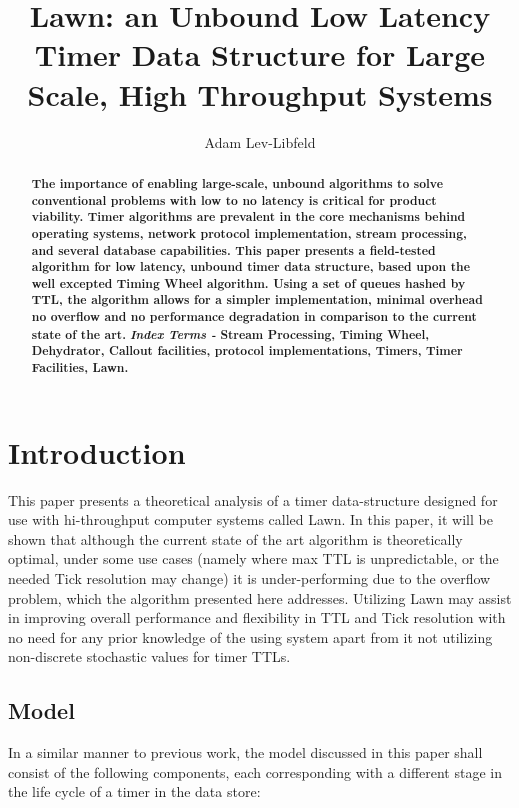 \documentclass[acmsmall]{acmart} %
\title{Lawn: an Unbound Low Latency Timer Data Structure for Large Scale, High Throughput Systems}
\author{Adam Lev-Libfeld}
\affiliation{
	\institution{Tamar Labs}
	\city{Tel-Aviv}
	\state{Israel}
}
\begin{document}
\maketitle

\begin{abstract}
\textbf{\noindent The importance of enabling large-scale, unbound algorithms to solve conventional problems with low to no latency is critical for product viability\cite{WHT}. Timer algorithms are prevalent in the core mechanisms behind operating systems\cite{BSD}, network protocol implementation, stream processing, and several database capabilities. This paper presents a field-tested algorithm for low latency, unbound timer data structure, based upon the well excepted Timing Wheel algorithm. Using a set of queues hashed by TTL, the algorithm allows for a simpler implementation, minimal overhead no overflow and no performance degradation in comparison to the current state of the art.}
\linebreak \linebreak
\textbf{\textit{Index Terms -} Stream Processing, Timing Wheel, Dehydrator, Callout facilities, protocol implementations, Timers, Timer Facilities, Lawn.}
\end{abstract}


\section{Introduction}
This paper presents a theoretical analysis of a timer data-structure designed for use with hi-throughput computer systems called Lawn. In this paper, it will be shown that although the current state of the art algorithm is theoretically optimal, under some use cases (namely where max TTL is unpredictable, or the needed Tick resolution may change) it is under-performing due to the overflow problem, which the algorithm presented here addresses. Utilizing Lawn may assist in improving overall performance and flexibility in TTL and Tick resolution with no need for any prior knowledge of the using system apart from it not utilizing non-discrete stochastic values for timer TTLs.
\subsection{Model}
In a similar manner to previous work\cite{TW}\cite{CQ}\cite{EMP}, the model discussed in this paper shall consist of the following components, each corresponding with a different stage in the life cycle of a timer in the data store:
\end{document}
